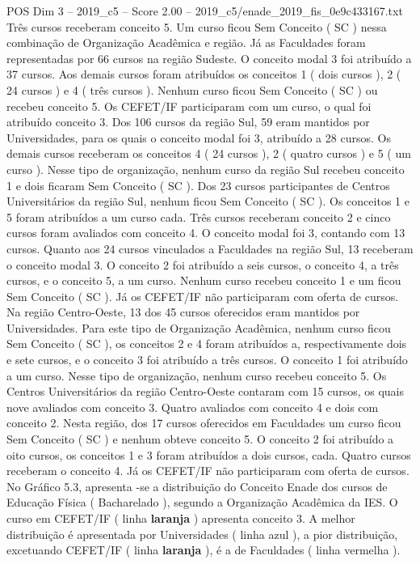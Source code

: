 \begin{textsample}{POS Dim 3 – 2019\_c5 – Score 2.00 – 2019\_c5/enade\_2019\_fis\_0e9c433167.txt}
Três cursos receberam conceito 5.
Um curso ficou Sem Conceito ( SC ) nessa combinação de Organização Acadêmica e região.
Já as Faculdades foram representadas por 66 cursos na região Sudeste.
O conceito modal 3 foi atribuído a 37 cursos.
Aos demais cursos foram atribuídos os conceitos 1 ( dois cursos ), 2 ( 24 cursos ) e 4 ( três cursos ).
Nenhum curso ficou Sem Conceito ( SC ) ou recebeu conceito 5.
Os CEFET/IF participaram com um curso, o qual foi atribuído conceito 3.
Dos 106 cursos da região Sul, 59 eram mantidos por Universidades, para os quais o conceito modal foi 3, atribuído a 28 cursos.
Os demais cursos receberam os conceitos 4 ( 24 cursos ), 2 ( quatro cursos ) e 5 ( um curso ).
Nesse tipo de organização, nenhum curso da região Sul recebeu conceito 1 e dois ficaram Sem Conceito ( SC ).
Dos 23 cursos participantes de Centros Universitários da região Sul, nenhum ficou Sem Conceito ( SC ).
Os conceitos 1 e 5 foram atribuídos a um curso cada.
Três cursos receberam conceito 2 e cinco cursos foram avaliados com conceito 4.
O conceito modal foi 3, contando com 13 cursos.
Quanto aos 24 cursos vinculados a Faculdades na região Sul, 13 receberam o conceito modal 3.
O conceito 2 foi atribuído a seis cursos, o conceito 4, a três cursos, e o conceito 5, a um curso.
Nenhum curso recebeu conceito 1 e um ficou Sem Conceito ( SC ).
Já os CEFET/IF não participaram com oferta de cursos.
Na região Centro-Oeste, 13 dos 45 cursos oferecidos eram mantidos por Universidades.
Para este tipo de Organização Acadêmica, nenhum curso ficou Sem Conceito ( SC ), os conceitos 2 e 4 foram atribuídos a, respectivamente dois e sete cursos, e o conceito 3 foi atribuído a três cursos.
O conceito 1 foi atribuído a um curso.
Nesse tipo de organização, nenhum curso recebeu conceito 5.
Os Centros Universitários da região Centro-Oeste contaram com 15 cursos, os quais nove avaliados com conceito 3.
Quatro avaliados com conceito 4 e dois com conceito 2.
Nesta região, dos 17 cursos oferecidos em Faculdades um curso ficou Sem Conceito ( SC ) e nenhum obteve conceito 5.
O conceito 2 foi atribuído a oito cursos, os conceitos 1 e 3 foram atribuídos a dois cursos, cada.
Quatro cursos receberam o conceito 4.
Já os CEFET/IF não participaram com oferta de cursos.
No Gráfico 5.3, apresenta -se a distribuição do Conceito Enade dos cursos de Educação Física ( Bacharelado ), segundo a Organização Acadêmica da IES.
O curso em CEFET/IF ( linha \textbf{laranja} ) apresenta conceito 3.
A melhor distribuição é apresentada por Universidades ( linha azul ), a pior distribuição, excetuando CEFET/IF ( linha \textbf{laranja} ), é a de Faculdades ( linha vermelha ).

\end{textsample}

